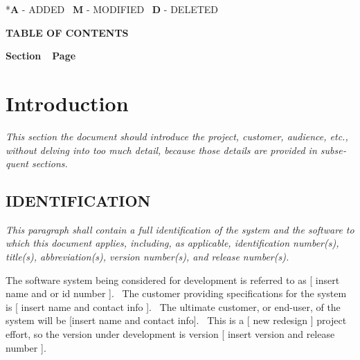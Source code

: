 \documentclass[twoside,letterpaper]{article}
\begin{document}
{\color{black}
\foreignlanguage{english}{*}\foreignlanguage{english}{\textbf{A}}\foreignlanguage{english}{
- ADDED
\ }\foreignlanguage{english}{\textbf{M}}\foreignlanguage{english}{ -
MODIFIED
\ }\foreignlanguage{english}{\textbf{D}}\foreignlanguage{english}{ -
DELETED}}


{\centering{}\bfseries\color{black}
TABLE OF CONTENTS
\par}


\bigskip

{\bfseries\color{black}
Section\ \ Page}

\setcounter{tocdepth}{9}
\renewcommand\contentsname{}
\tableofcontents

\bigskip

\clearpage\clearpage\setcounter{page}{1}\pagestyle{Convertii}
\section[Introduction]{\rmfamily\bfseries\color{black}
Introduction}
{\color{black}
\foreignlanguage{english}{\textit{This section the document should
introduce the project, customer, audience, etc., without delving into
too much detail, because those details are provided in subsequent
sections.}}\foreignlanguage{english}{ \ }}

\subsection[IDENTIFICATION]{\rmfamily\bfseries\color{black}
IDENTIFICATION}
{\itshape\color{black}
This paragraph shall contain a full identification of the system and the
software to which this document applies, including, as applicable,
identification number(s), title(s), abbreviation(s), version number(s),
and release number(s).}

{\color{black}
The software system being considered for development is referred to as [
insert name and or id number ]. \ The customer providing specifications
for the system is [ insert name and contact info ]. \ The ultimate
customer, or end-user, of the system will be [insert name and contact
info]. \ This is a [ new {\textbar} redesign ] project effort, so the
version under development is version [ insert version and release
number ].}
\end{document}
